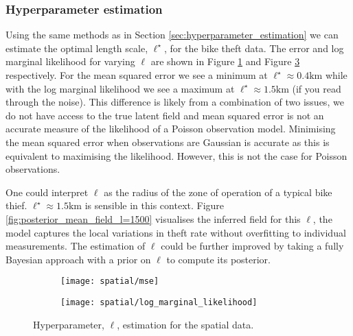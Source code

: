 \documentclass[11pt]{article}
\begin{document}
\subsubsection{Hyperparameter estimation}
Using the same methods as in Section \ref{sec:hyperparameter_estimation} we can estimate the optimal length scale, $\ell^{\star}$, for the bike theft data. The error and log marginal likelihood for varying $\ell$ are shown in Figure \ref{fig:spatial_mse} and Figure \ref{fig:spatial_marginal_likelihood} respectively. For the mean squared error we see a minimum at $\ell^{\star} \approx 0.4\text{km}$ while with the log marginal likelihood we see a maximum at $\ell^{\star} \approx 1.5\text{km}$ (if you read through the noise). This difference is likely from a combination of two issues, we do not have access to the true latent field and mean squared error is not an accurate measure of the likelihood of a Poisson observation model. Minimising the mean squared error when observations are Gaussian is accurate as this is equivalent to maximising the likelihood. However, this is not the case for Poisson observations. 

One could interpret $\ell$ as the radius of the zone of operation of a typical bike thief. $\ell^{\star} \approx 1.5\text{km}$ is sensible in this context. Figure \ref{fig:posterior_mean_field_l=1500} visualises the inferred field for this $\ell$, the model captures the local variations in theft rate without overfitting to individual measurements. The estimation of $\ell$ could be further improved by taking a fully Bayesian approach with a prior on $\ell$ to compute its posterior.

\begin{figure}
    \centering
    \begin{subfigure}{0.45\textwidth}
        \texttt{[image: spatial/mse]}
        \label{fig:spatial_mse}
    \end{subfigure}
    \begin{subfigure}{0.45\textwidth}
        \texttt{[image: spatial/log\_marginal\_likelihood]}
        \label{fig:spatial_marginal_likelihood}
    \end{subfigure}
    \caption{Hyperparameter, $\ell$, estimation for the spatial data.}
\end{figure}



\end{document}
